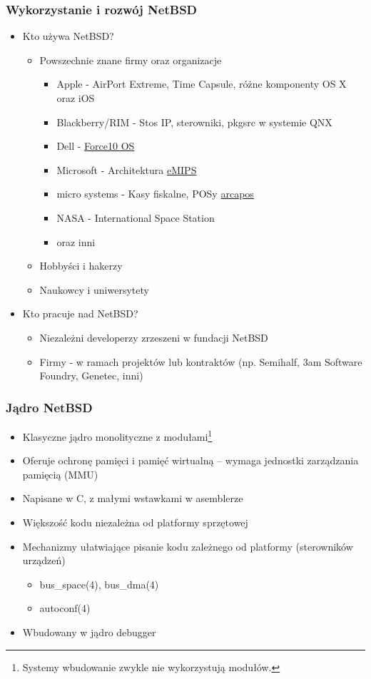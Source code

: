 \documentclass[dvipsnames,table]{beamer}
\begin{document}
\begin{frame}
\frametitle{Wykorzystanie i rozwój NetBSD}
\begin{itemize}
\item Kto używa NetBSD?
\begin{itemize}
	\item Powszechnie znane firmy oraz organizacje
	\begin{itemize}
		\item Apple - AirPort Extreme, Time Capsule, różne komponenty OS X oraz iOS
		\item Blackberry/RIM - Stos IP, sterowniki, pkgsrc w systemie QNX
		\item Dell - \href{http://www.dell.com/us/business/p/force10-ftos/pd}{Force10 OS}
 		\item Microsoft - Architektura \href{http://research.microsoft.com/en-us/projects/emips/}{eMIPS}
		\item micro systems - Kasy fiskalne, POSy \href{http://www.arcapos.ch/produkt/}{arcapos}
		\item NASA - International Space Station
		\item oraz inni
	\end{itemize}
	\item Hobbyści i hakerzy
	\item Naukowcy i uniwersytety
\end{itemize}
\item{Kto pracuje nad NetBSD?}
\begin{itemize}
	\item Niezależni developerzy zrzeszeni w fundacji NetBSD
	\item Firmy - w ramach projektów lub kontraktów (np. Semihalf, 3am Software Foundry, Genetec, inni)
\end{itemize}

\end{itemize}
\end{frame}


\begin{frame}
\frametitle{Jądro NetBSD}
\begin{itemize}
	\item Klasyczne jądro monolityczne z modułami\footnote{Systemy wbudowanie zwykle nie wykorzystują modułów.}
	\item Oferuje ochronę pamięci i pamięć wirtualną -- wymaga jednostki zarządzania pamięcią (MMU)
	\item Napisane w C, z małymi wstawkami w asemblerze
	\item Większość kodu niezależna od platformy sprzętowej
	\item Mechanizmy ułatwiające pisanie kodu zależnego od platformy (sterowników urządzeń)
	\begin{itemize}
		\item bus\_space(4), bus\_dma(4)
		\item autoconf(4)
	\end{itemize}
	\item Wbudowany w jądro debugger

\end{itemize}
\end{frame}
\end{document}
